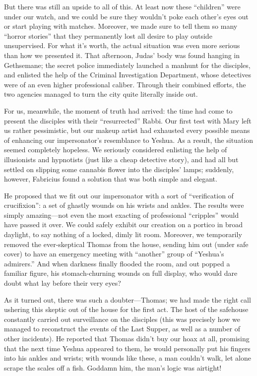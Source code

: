 But there was still an upside to all of this. At least now these ``children'' were under our watch, and we could be sure they wouldn't poke each other's eyes out or start playing with matches. Moreover, we made sure to tell them so many ``horror stories'' that they permanently lost all desire to play outside unsupervised. For what it's worth, the actual situation was even more serious than how we presented it. That afternoon, Judas' body was found hanging in Gethsemane; the secret police immediately launched a manhunt for the disciples, and enlisted the help of the Criminal Investigation Department, whose detectives were of an even higher professional caliber. Through their combined efforts, the two agencies managed to turn the city quite literally inside out.

For us, meanwhile, the moment of truth had arrived: the time had come to present the disciples with their ``resurrected'' Rabbi. Our first test with Mary left us rather pessimistic, but our makeup artist had exhausted every possible means of enhancing our impersonator's resemblance to Yeshua. As a result, the situation seemed completely hopeless. We seriously considered enlisting the help of illusionists and hypnotists (just like a cheap detective story), and had all but settled on slipping some cannabis flower into the disciples' lamps; suddenly, however, Fabricius found a solution that was both simple and elegant.

He proposed that we fit out our impersonator with a sort of ``verification of crucifixion'': a set of ghastly wounds on his wrists and ankles. The results were simply amazing---not even the most exacting of professional ``cripples'' would have passed it over. We could safely exhibit our creation on a portico in broad daylight, to say nothing of a locked, dimly lit room. Moreover, we temporarily removed the ever-skeptical Thomas from the house, sending him out (under safe cover) to have an emergency meeting with ``another'' group of ``Yeshua's admirers.'' And when darkness finally flooded the room, and out popped a familiar figure, his stomach-churning wounds on full display, who would dare doubt what lay before their very eyes?

As it turned out, there was such a doubter---Thomas; we had made the right call ushering this skeptic out of the house for the first act. The host of the safehouse constantly carried out surveillance on the disciples (this was precisely how we managed to reconstruct the events of the Last Supper, as well as a number of other incidents). He reported that Thomas didn't buy our hoax at all, promising that the next time Yeshua appeared to them, he would personally put his fingers into his ankles and wrists; with wounds like these, a man couldn't walk, let alone scrape the scales off a fish. Goddamn him, the man's logic was airtight!

